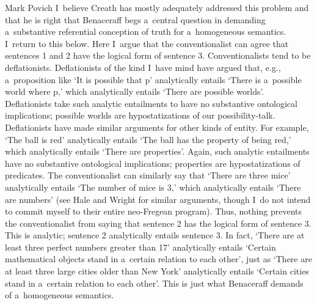 \begin{artengenv}{Mark Povich}
I~believe Creath
\parencite*[][]{creath_benacerraf_1980} %
 has mostly adequately addressed this problem and that he is right that Benaceraff begs a~central question in demanding a~substantive referential conception of truth for a~homogeneous semantics. I~return to this below. Here I~argue that the conventionalist can agree that sentences 1 and 2 have the logical form of sentence 3. Conventionalists tend to be deflationists. Deflationists of the kind I~have mind 
\parencites[][]{carnap_empiricism_1950}[][]{sider_reductive_2003}[][]{thomasson_ontology_2014}[see also][]{price_naturalism_2011} %
 have argued that, e.g., a~proposition like ‘It is possible that p' analytically entails ‘There is a~possible world where p,' which analytically entails ‘There are possible worlds'. Deflationists take such analytic entailments to have no substantive ontological implications; possible worlds are hypostatizations of our possibility-talk. Deflationists have made similar arguments for other kinds of entity. For example, ‘The ball is red' analytically entails ‘The ball has the property of being red,' which analytically entails ‘There are properties'. Again, such analytic entailments have no substantive ontological implications; properties are hypostatizations of predicates. The conventionalist can similarly say that ‘There are three mice' analytically entails ‘The number of mice is 3,' which analytically entails ‘There are numbers' (see Hale and Wright 
\parencite*[][]{hale_reasons_2001} %
 for similar arguments, though I~do not intend to commit myself to their entire neo-Fregean program). Thus, nothing prevents the conventionalist from saying that sentence 2 has the logical form of sentence 3. This is analytic; sentence 2 analytically entails sentence 3. In fact, ‘There are at least three perfect numbers greater than 17' analytically entails ‘Certain mathematical objects stand in a~certain relation to each other', just as ‘There are at least three large cities older than New York' analytically entails ‘Certain cities stand in a~certain relation to each other'. This is just what Benaceraff demands of a~homogeneous semantics.


\end{artengenv}
